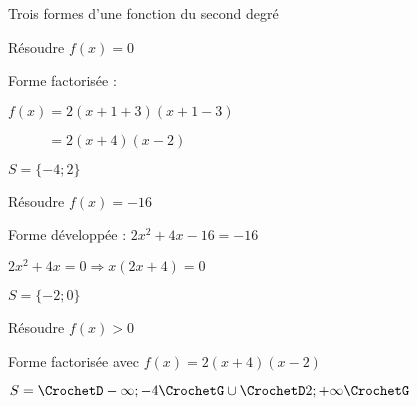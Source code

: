 \begin{EXO}{Trois formes d'une fonction du second degré}{}
\begin{tcbenumerate}[2][3]
\begin{tcbenumerate}[2][1][alph]
\begin{crep}[colback=white,colframe=white]
\end{crep}

\tcbitem {} Résoudre $f(x)=0$

\begin{crep}
Forme factorisée : 

$f(x) = 2(x+1+3)(x+1-3) $

$\phantom{f(x)}= 2(x+4)(x-2)$

$S = \{-4 ; 2\}$
\end{crep}

\tcbitem {} Résoudre $f(x)=-16$

\begin{crep}
Forme développée : $2x^2+4x-16 = -16$

$2x^2+4x = 0 \Rightarrow x(2x+4) = 0$

$S = \{-2 ; 0\}$
\end{crep}

\tcbitem {} Résoudre $f(x)>0$

\begin{crep}
Forme factorisée avec $f(x) = 2(x+4)(x-2)$

$S = \CrochetD-\infty;-4\CrochetG \cup \CrochetD2;+\infty\CrochetG$
\end{crep}
\end{tcbenumerate}
\end{tcbenumerate}
\end{EXO}